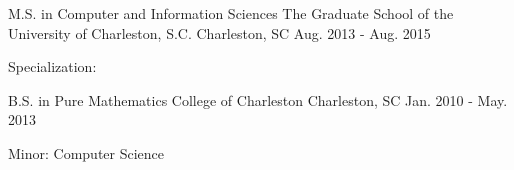 

\begin{cveducations}

  \cveducation
    {M.S. in Computer and Information Sciences} %
    {The Graduate School of the University of Charleston, S.C.} %
    {Charleston, SC} %
    {Aug. 2013 - Aug. 2015} %
    {
      \begin{cvitems} %
        \item {Specialization: }
      \end{cvitems}
    }

  \cveducation
    {B.S. in Pure Mathematics} %
    {College of Charleston} %
    {Charleston, SC} %
    {Jan. 2010 - May. 2013} %
    {
      \begin{cvitems} %
        \item {Minor: Computer Science}
      \end{cvitems}
    }

\end{cveducations}
